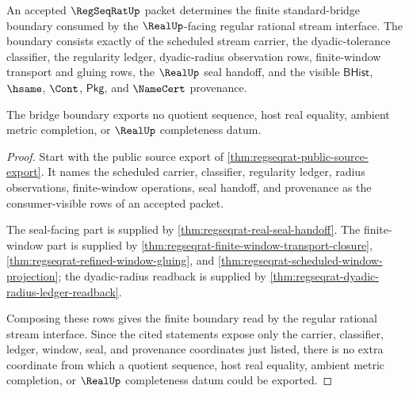\begin{theorem}
\label{thm:regseqrat-standard-bridge-boundary}
An accepted $\RegSeqRatUp$ packet determines the finite standard-bridge boundary consumed by the $\RealUp$-facing regular rational stream interface. The boundary consists exactly of the scheduled stream carrier, the dyadic-tolerance classifier, the regularity ledger, dyadic-radius observation rows, finite-window transport and gluing rows, the $\RealUp$ seal handoff, and the visible $\mathsf{BHist}$, $\hsame$, $\Cont$, $\mathsf{Pkg}$, and $\NameCert$ provenance.

The bridge boundary exports no quotient sequence, host real equality, ambient metric completion, or $\RealUp$ completeness datum.
\end{theorem}
\begin{proof}
Start with the public source export of \autoref{thm:regseqrat-public-source-export}. It names the scheduled carrier, classifier, regularity ledger, radius observations, finite-window operations, seal handoff, and provenance as the consumer-visible rows of an accepted packet.

The seal-facing part is supplied by \autoref{thm:regseqrat-real-seal-handoff}. The finite-window part is supplied by \autoref{thm:regseqrat-finite-window-transport-closure}, \autoref{thm:regseqrat-refined-window-gluing}, and \autoref{thm:regseqrat-scheduled-window-projection}; the dyadic-radius readback is supplied by \autoref{thm:regseqrat-dyadic-radius-ledger-readback}.

Composing these rows gives the finite boundary read by the regular rational stream interface. Since the cited statements expose only the carrier, classifier, ledger, window, seal, and provenance coordinates just listed, there is no extra coordinate from which a quotient sequence, host real equality, ambient metric completion, or $\RealUp$ completeness datum could be exported.
\end{proof}

